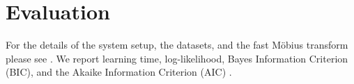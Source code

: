 \documentclass{article}
\begin{document}
\section{Evaluation} 
For the details of the system setup, the datasets, and the fast M\"obius transform please see \cite{Schulte2012}. We report learning time, log-likelihood, Bayes Information Criterion (BIC), and the Akaike Information Criterion (AIC) \cite{Chickering2003}. 
%


\end{document}
